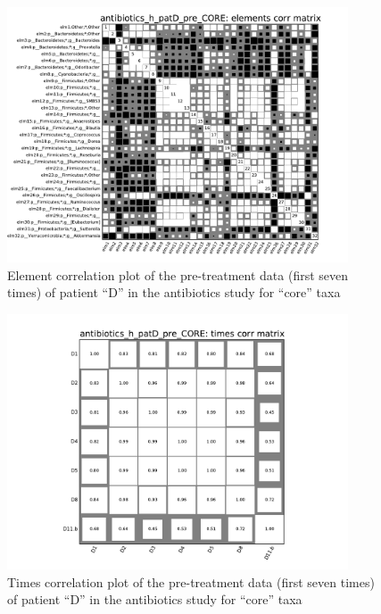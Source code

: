 \documentclass[12pt,oneside,letterpaper]{article}
\begin{document}
\begin{figure}
	\centering
	\includegraphics[width=0.9\textwidth]{results/corrank/antibiotics_h_patD_pre_CORE_ElementsCorr}
	\caption{Element correlation plot of the pre-treatment data (first seven times) of patient ``D'' in the antibiotics study\cite{antibiotic} for ``core'' taxa}
	\label{fig:corrElm}
\end{figure}

\begin{figure}
	\centering
	\includegraphics[width=0.9\textwidth]{results/corrank/antibiotics_h_patD_pre_CORE_TimesCorr}
	\caption{Times correlation plot of the pre-treatment data (first seven times) of patient ``D'' in the antibiotics study\cite{antibiotic} for ``core'' taxa}
	\label{fig:corrTim}
\end{figure}
\end{document}
